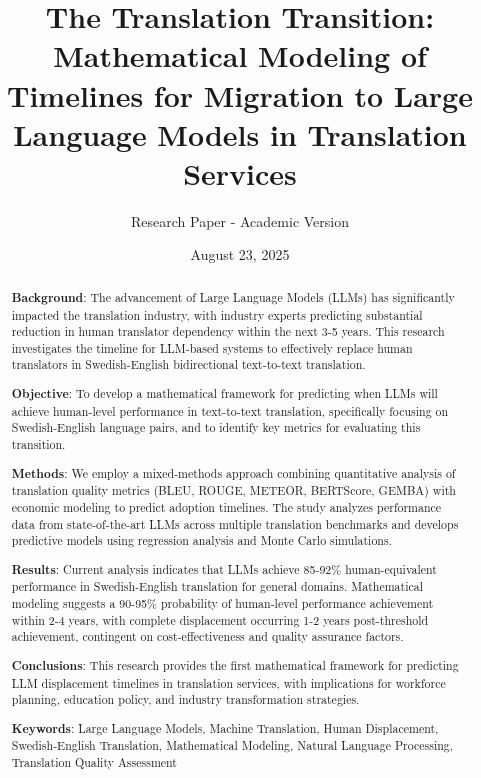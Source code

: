 \documentclass[12pt,a4paper]{article}
\author{}
\date{}
\title{The Translation Transition: Mathematical Modeling of Timelines for Migration to Large Language Models in Translation Services}
\author{Research Paper - Academic Version}
\date{August 23, 2025}
\begin{document}
\maketitle
\thispagestyle{empty}

\newpage
\begin{abstract}
\textbf{Background}: The advancement of Large Language Models (LLMs) has significantly impacted the translation industry, with industry experts predicting substantial reduction in human translator dependency within the next 3-5 years. This research investigates the timeline for LLM-based systems to effectively replace human translators in Swedish-English bidirectional text-to-text translation.

\textbf{Objective}: To develop a mathematical framework for predicting when LLMs will achieve human-level performance in text-to-text translation, specifically focusing on Swedish-English language pairs, and to identify key metrics for evaluating this transition.

\textbf{Methods}: We employ a mixed-methods approach combining quantitative analysis of translation quality metrics (BLEU, ROUGE, METEOR, BERTScore, GEMBA) with economic modeling to predict adoption timelines. The study analyzes performance data from state-of-the-art LLMs across multiple translation benchmarks and develops predictive models using regression analysis and Monte Carlo simulations.

\textbf{Results}: Current analysis indicates that LLMs achieve 85-92\% human-equivalent performance in Swedish-English translation for general domains. Mathematical modeling suggests a 90-95\% probability of human-level performance achievement within 2-4 years, with complete displacement occurring 1-2 years post-threshold achievement, contingent on cost-effectiveness and quality assurance factors.

\textbf{Conclusions}: This research provides the first mathematical framework for predicting LLM displacement timelines in translation services, with implications for workforce planning, education policy, and industry transformation strategies.

\noindent \textbf{Keywords}: Large Language Models, Machine Translation, Human Displacement, Swedish-English Translation, Mathematical Modeling, Natural Language Processing, Translation Quality Assessment
\end{abstract}

\newpage
\tableofcontents
\newpage
\end{document}
